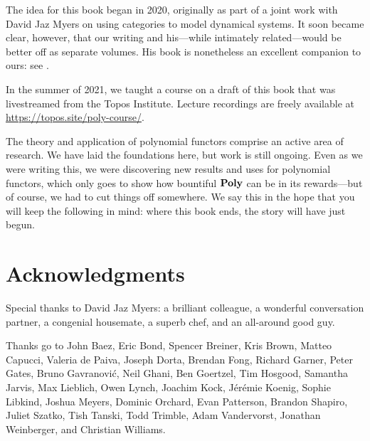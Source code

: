 \documentclass[Book-Poly]{subfiles}
\begin{document}
The idea for this book began in 2020, originally as part of a joint work with David Jaz Myers on using categories to model dynamical systems.
It soon became clear, however, that our writing and his---while intimately related---would be better off as separate volumes.
His book is nonetheless an excellent companion to ours: see \cite{jaz}.

In the summer of 2021, we taught a course on a draft of this book that was livestreamed from the Topos Institute.
Lecture recordings are freely available at \url{https://topos.site/poly-course/}.

The theory and application of polynomial functors comprise an active area of research.
We have laid the foundations here, but work is still ongoing.
Even as we were writing this, we were discovering new results and uses for polynomial functors, which only goes to show how bountiful $\mathbf{Poly}$ can be in its rewards---but of course, we had to cut things off somewhere.
We say this in the hope that you will keep the following in mind: where this book ends, the story will have just begun.

\section*{Acknowledgments}

Special thanks to David Jaz Myers: a brilliant colleague, a wonderful conversation partner, a congenial housemate, a superb chef, and an all-around good guy. 

Thanks go to John Baez, Eric Bond, Spencer Breiner, Kris Brown, Matteo Capucci, Valeria de Paiva, Joseph Dorta, Brendan Fong, Richard Garner, Peter Gates, Bruno Gavranovi\'c, Neil Ghani, Ben Goertzel, Tim Hosgood, Samantha Jarvis, Max Lieblich, Owen Lynch, Joachim Kock, J\'er\'emie Koenig, Sophie Libkind, Joshua Meyers, Dominic Orchard, Evan Patterson, Brandon Shapiro, Juliet Szatko, Tish Tanski, Todd Trimble, Adam Vandervorst, Jonathan Weinberger, and Christian Williams.
\end{document}

